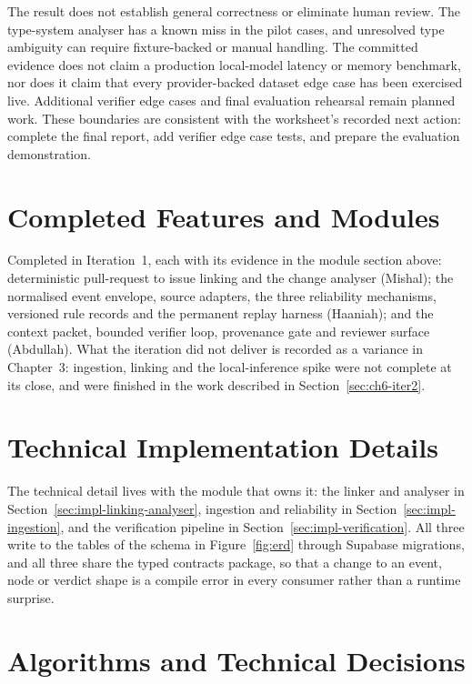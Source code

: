 The result does not establish general correctness or eliminate human review.
The type-system analyser has a known miss in the pilot cases, and unresolved
type ambiguity can require fixture-backed or manual handling. The committed
evidence does not claim a production local-model latency or memory benchmark,
nor does it claim that every provider-backed dataset edge case has been
exercised live. Additional verifier edge cases and final evaluation
rehearsal remain planned work. These boundaries are consistent with the
worksheet's recorded next action: complete the final report, add verifier edge
case tests, and prepare the evaluation demonstration.

\section{Completed Features and Modules}

Completed in Iteration~1, each with its evidence in the module section above:
deterministic pull-request to issue linking and the change analyser (Mishal);
the normalised event envelope, source adapters, the three reliability mechanisms,
versioned rule records and the permanent replay harness (Haaniah); and the
context packet, bounded verifier loop, provenance gate and reviewer surface
(Abdullah). What the iteration did not deliver is recorded as a variance in
Chapter~3: ingestion, linking and the local-inference spike were not complete at
its close, and were finished in the work described in
Section~\ref{sec:ch6-iter2}.

\section{Technical Implementation Details}

The technical detail lives with the module that owns it: the linker and analyser
in Section~\ref{sec:impl-linking-analyser}, ingestion and reliability in
Section~\ref{sec:impl-ingestion}, and the verification pipeline in
Section~\ref{sec:impl-verification}. All three write to the tables of the schema
in Figure~\ref{fig:erd} through Supabase migrations, and all three share the
typed contracts package, so that a change to an event, node or verdict shape is
a compile error in every consumer rather than a runtime surprise.

\section{Algorithms and Technical Decisions}

